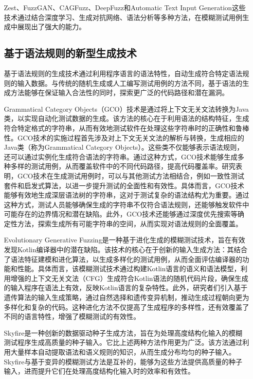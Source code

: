 \documentclass[10.5pt,compsoc]{CjC}
\theoremstyle{mystyle}
\begin{document}
Zest、FuzzGAN、CAGFuzz、DeepFuzz和Automatic Text Input Generation这些技术通过结合深度学习、生成对抗网络、语法分析等多种方法，在模糊测试用例生成中展现出了强大的能力。

\vspace{10mm}

\subsection{基于语法规则的新型生成技术}

基于语法规则的生成技术通过利用程序语言的语法特性，自动生成符合特定语法规则的输入数据。与传统的随机生成或人工编写测试用例的方法不同，基于语法的生成方法能够在保证输入合法性的同时，探索更广泛的代码路径和潜在漏洞。

Grammatical Category Objects（GCO）技术是通过将上下文无关文法转换为Java类，以实现自动化测试数据的生成\cite{Beyene}。该方法的核心在于利用语法的结构特征，生成符合特定格式的字符串，从而有效地测试软件在处理这些字符串时的正确性和鲁棒性。GCO技术的实施过程首先涉及对上下文无关文法的解析与转换，生成相应的Java类（称为Grammatical Category Objects）。这些类不仅能够表示语法规则，还可以通过实例化生成符合语法的字符串。通过这种方式，GCO技术能够生成多种多样的测试用例，从而覆盖软件中的不同代码路径，提高代码覆盖率。研究表明，GCO技术在生成测试用例时，可以与其他测试方法相结合，例如一致性测试套件和启发式算法，以进一步提升测试的全面性和有效性。具体而言，GCO技术能够有效地生成深层语法树的字符串，这对于测试复杂的语法结构尤为重要。通过这种方式，测试人员能够确保生成的字符串不仅符合语法规则，还能够触发软件中可能存在的边界情况和潜在缺陷。此外，GCO技术还能够通过深度优先搜索等确定性方法，探索生成所有可能字符串的空间，从而实现对语法规则的全面覆盖。

Evolutionary Generative Fuzzing是一种基于进化生成的模糊测试技术\cite{Evo}，旨在有效发现Kotlin编译器中的潜在缺陷。该技术的核心在于创新的输入生成方法：其结合了语法特征建模和进化算法，以生成多样化的测试用例，从而全面评估编译器的功能和性能。具体而言，该模糊测试技术通过构建Kotlin语言的语义和语法模型，利用增强的上下文无关文法（CFG）生成符合Kotlin语法的随机代码片段，确保生成的输入程序在语法上有效，反映Kotlin语言的复杂特性。此外，研究者们引入基于遗传算法的输入生成策略，通过自然选择和遗传变异机制，推动生成过程朝向更为多样化和复杂的代码。这种进化方法不仅提高了生成程序的多样性，还有效覆盖了不同的语言特性，增强了模糊测试的有效性。

Skyfire是一种创新的数据驱动种子生成方法，旨在为处理高度结构化输入的模糊测试程序生成高质量的种子输入\cite{Skyfire}。它比上述两种方法作用更为广泛。该方法通过利用大量样本自动提取语法和语义规则的知识，从而生成分布均匀的种子输入。Skyfire与基于变异的模糊测试方法是互补的，能够为这些方法提供高质量的种子输入，进而提升它们在处理高度结构化输入时的效率和有效性。
\end{document}
